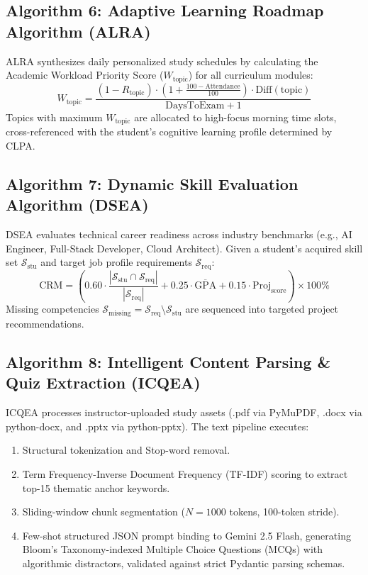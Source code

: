 \documentclass[11pt,a4paper]{article}
\begin{document}
\subsection{Algorithm 6: Adaptive Learning Roadmap Algorithm (ALRA)}
ALRA synthesizes daily personalized study schedules by calculating the Academic Workload Priority Score ($W_{\text{topic}}$) for all curriculum modules:
\begin{equation}
W_{\text{topic}} = \frac{(1 - R_{\text{topic}}) \cdot \left( 1 + \frac{100 - \text{Attendance}}{100} \right) \cdot \text{Diff}(\text{topic})}{\text{DaysToExam} + 1}
\label{eq:alra}
\end{equation}
Topics with maximum $W_{\text{topic}}$ are allocated to high-focus morning time slots, cross-referenced with the student's cognitive learning profile determined by CLPA.

\subsection{Algorithm 7: Dynamic Skill Evaluation Algorithm (DSEA)}
DSEA evaluates technical career readiness across industry benchmarks (e.g., AI Engineer, Full-Stack Developer, Cloud Architect). Given a student's acquired skill set $\mathcal{S}_{\text{stu}}$ and target job profile requirements $\mathcal{S}_{\text{req}}$:
\begin{equation}
\text{CRM} = \left( 0.60 \cdot \frac{|\mathcal{S}_{\text{stu}} \cap \mathcal{S}_{\text{req}}|}{|\mathcal{S}_{\text{req}}|} + 0.25 \cdot \overline{\text{GPA}} + 0.15 \cdot \text{Proj}_{\text{score}} \right) \times 100\%
\label{eq:dsea}
\end{equation}
Missing competencies $\mathcal{S}_{\text{missing}} = \mathcal{S}_{\text{req}} \setminus \mathcal{S}_{\text{stu}}$ are sequenced into targeted project recommendations.

\subsection{Algorithm 8: Intelligent Content Parsing \& Quiz Extraction (ICQEA)}
ICQEA processes instructor-uploaded study assets (.pdf via PyMuPDF, .docx via python-docx, and .pptx via python-pptx). The text pipeline executes:
\begin{enumerate}
    \item Structural tokenization and Stop-word removal.
    \item Term Frequency-Inverse Document Frequency (TF-IDF) scoring to extract top-15 thematic anchor keywords.
    \item Sliding-window chunk segmentation ($N = 1000$ tokens, 100-token stride).
    \item Few-shot structured JSON prompt binding to Gemini 2.5 Flash, generating Bloom's Taxonomy-indexed Multiple Choice Questions (MCQs) with algorithmic distractors, validated against strict Pydantic parsing schemas.
\end{enumerate}
\end{document}
